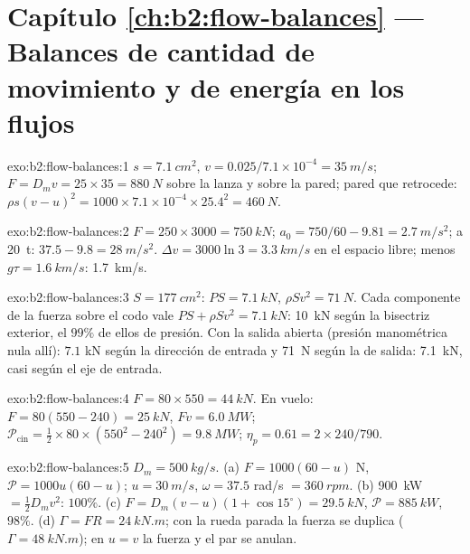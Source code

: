 \section*{Capítulo \ref{ch:b2:flow-balances} --- Balances de cantidad de movimiento y de energía en los flujos}

\begin{solution}{exo:b2:flow-balances:1}
$s = \qty{7.1}{cm^2}$, $v = 0.025/7.1 \times 10^{-4} = \qty{35}{m/s}$; $F = D_mv = 25
\times 35 = \qty{880}{N}$ sobre la lanza y sobre la pared; pared que retrocede: $\rho s(v -
u)^2 = 1000 \times 7.1 \times 10^{-4} \times 25.4^2 = \qty{460}{N}$.
\end{solution}

\begin{solution}{exo:b2:flow-balances:2}
$F = 250 \times 3000 = \qty{750}{kN}$; $a_0 = 750/60 - 9.81 = \qty{2.7}{m/s^2}$; a
\qty{20}{t}: $37.5 - 9.8 = \qty{28}{m/s^2}$. $\Delta v = 3000\ln3 = \qty{3.3}{km/s}$ en
el espacio libre; menos $g\tau = \qty{1.6}{km/s}$: \qty{1.7}{km/s}.
\end{solution}

\begin{solution}{exo:b2:flow-balances:3}
$S = \qty{177}{cm^2}$: $PS = \qty{7.1}{kN}$, $\rho Sv^2 = \qty{71}{N}$. Cada componente
de la fuerza sobre el codo vale $PS + \rho Sv^2 = \qty{7.1}{kN}$: \qty{10}{kN} según
la bisectriz exterior, el $99\%$ de ellos de presión. Con la salida abierta (presión manométrica
nula allí): $7.1$ kN según la dirección de entrada y \qty{71}{N} según la
de salida: \qty{7.1}{kN}, casi según el eje de entrada.
\end{solution}

\begin{solution}{exo:b2:flow-balances:4}
$F = 80 \times 550 = \qty{44}{kN}$. En vuelo: $F = 80(550 - 240) = \qty{25}{kN}$, $Fv =
\qty{6.0}{MW}$; $\mathcal P_{\text{cin}} = \tfrac12 \times 80 \times (550^2 - 240^2) =
\qty{9.8}{MW}$; $\eta_p = 0.61 = 2 \times 240/790$.
\end{solution}

\begin{solution}{exo:b2:flow-balances:5}
$D_m = \qty{500}{kg/s}$. (a) $F = 1000(60 - u)$ N, $\mathcal P = 1000u(60 - u)$; $u =
\qty{30}{m/s}$, $\omega = 37.5$ rad/s $= \qty{360}{rpm}$. (b) \qty{900}{kW} $=
\tfrac12D_mv^2$: $100\%$. (c) $F = D_m(v - u)(1 + \cos15^\circ) = \qty{29.5}{kN}$, $\mathcal P
= \qty{885}{kW}$, $98\%$. (d) $\Gamma = FR = \qty{24}{kN.m}$; con la rueda parada la fuerza se
duplica ($\Gamma = \qty{48}{kN.m}$); en $u = v$ la fuerza y el par se anulan.
\end{solution}

